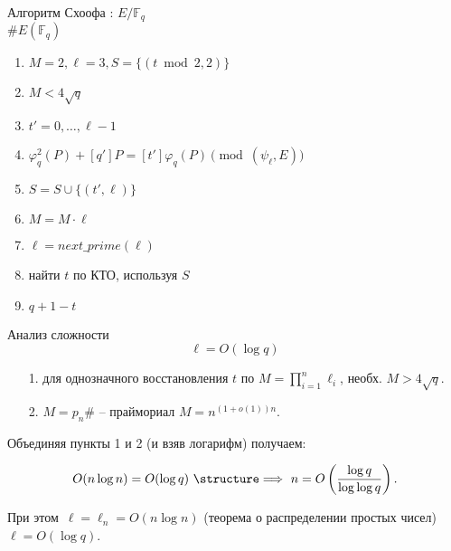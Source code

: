 \documentclass{beamer}
\begin{document}
\begin{frame}{Алгоритм Схоофа}
: $E/\mathbb{F}_q$\\
 $\#E(\mathbb{F}_q)$\\
\begin{enumerate}
    \item $M = 2, \ell = 3, S = \{(t \bmod{2}, 2)\}$
    \item {} $M < 4 \sqrt{q}$ 
    \item \quad {} $t' = 0, \ldots, \ell-1$ 
    \item \quad \quad {} $\varphi_q^2(P) + [q'] P = [t']\varphi_q(P) \pmod{(\psi_\ell, E)}$  \\
    \quad \quad \quad {}
    \item \quad $S = S \cup \{ (t',\ell) \}$
    \item \quad $M = M \cdot \ell$
    \item \quad $\ell = next\_prime(\ell)$
    \item найти $t$ по КТО, используя $S$
    \item {} $q + 1 - t$
\end{enumerate}
\end{frame}

\begin{frame}{Анализ сложности}
\[\ell = O(\log{q})\]
\ProofBegin
\begin{enumerate}
    \item[1.] для однозначного восстановления $t$ по $M = \prod\limits_{i=1}^{n} \ell_i$, необх. $M > 4 \sqrt{q}$.
    \item[2.] $M = p_n\#$ -- праймориал \MyImplies $M = n^{(1+o(1)) n}$.
\end{enumerate}

\vspace{0.5em}
Объединяя пункты 1 и 2 (и взяв логарифм) получаем:

\[O(n \log{n}) = O(\log{q}) \text{\MyImplies} n = O\left(\frac{\log{q}}{\log{\log{q}}}\right).\]

\vspace{1em}
При этом~$\ell = \ell_n = O(n \log{n})$ (теорема о распределении простых чисел) \MyImplies $\ell = O(\log{q})$.

\ProofEnd
\end{frame}
\end{document}
